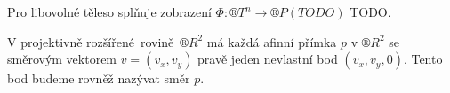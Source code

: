 \documentclass[12pt]{article}					%
\begin{document}
\begin{definice}
	Pro libovolné těleso splňuje zobrazení $\Phi: ®T^n \rightarrow ®P(TODO)$ TODO.
\end{definice}

\begin{veta}
	V projektivně rozšířené rovině $®R^2$ má každá afinní přímka $p$ v $®R^2$ se směrovým vektorem $v = (v_x, v_y)$ pravě jeden nevlastní bod $(v_x, v_y, 0)$. Tento bod budeme rovněž nazývat směr $p$.
\end{veta}
\end{document}
